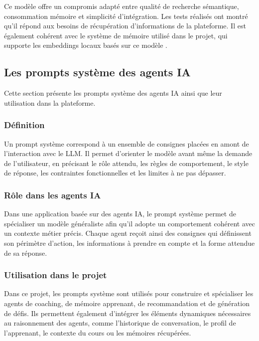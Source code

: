Ce modèle offre un compromis adapté entre qualité de recherche sémantique, consommation
mémoire et simplicité d'intégration. Les tests réalisés ont montré qu'il répond aux besoins de
récupération d'informations de la plateforme. Il est également cohérent avec le système de
mémoire utilisé dans le projet, qui supporte les embeddings locaux basés sur ce modèle
\cite{hindsight_models}.

\subsection{Les prompts système des agents IA}

Cette section présente les prompts système des agents IA ainsi que leur utilisation dans la plateforme.

\subsubsection{Définition}

Un prompt système \cite{kern_system_prompt} correspond à un ensemble de consignes placées
en amont de l'interaction avec le LLM. Il permet d'orienter le modèle avant même la demande
de l'utilisateur, en précisant le rôle attendu, les règles de comportement, le style de réponse,
les contraintes fonctionnelles et les limites à ne pas dépasser.

\subsubsection{Rôle dans les agents IA}

Dans une application basée sur des agents IA, le prompt système permet de spécialiser un
modèle généraliste afin qu'il adopte un comportement cohérent avec un contexte métier précis.
Chaque agent reçoit ainsi des consignes qui définissent son périmètre d'action, les informations
à prendre en compte et la forme attendue de sa réponse.

\subsubsection{Utilisation dans le projet}

Dans ce projet, les prompts système sont utilisés pour construire et spécialiser les agents de
coaching, de mémoire apprenant, de recommandation et de génération de défis. Ils permettent
également d'intégrer les éléments dynamiques nécessaires au raisonnement des agents, comme
l'historique de conversation, le profil de l'apprenant, le contexte du cours ou les mémoires
récupérées.

